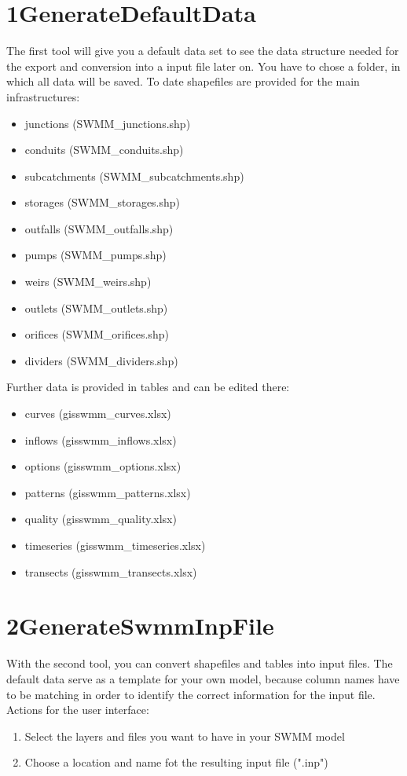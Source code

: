 \documentclass[10pt,a4paper,oneside]{scrbook}
\begin{document}
\section{1\textunderscore GenerateDefaultData} \label{tool1}
The first tool will give you a default data set to see the data structure needed for the export and conversion into a input file later on. You have to chose a folder, in which all data will be saved.  To date shapefiles are provided for the main infrastructures:
\begin{itemize}
	\setlength\itemsep{0pt}
    \item junctions (SWMM\_junctions.shp)
    \item conduits (SWMM\_conduits.shp)
    \item subcatchments (SWMM\_subcatchments.shp)
    \item storages (SWMM\_storages.shp)
    \item outfalls (SWMM\_outfalls.shp)
    \item pumps (SWMM\_pumps.shp)
    \item weirs (SWMM\_weirs.shp)
    \item outlets (SWMM\_outlets.shp)
    \item orifices (SWMM\_orifices.shp)
    \item dividers (SWMM\_dividers.shp)
\end{itemize}
Further data is provided in tables and can be edited there:
\begin{itemize}
	\setlength\itemsep{0pt}
    \item curves (gisswmm\_curves.xlsx)
    \item inflows (gisswmm\_inflows.xlsx)
    \item options (gisswmm\_options.xlsx)
    \item patterns (gisswmm\_patterns.xlsx)
    \item quality (gisswmm\_quality.xlsx)
    \item timeseries (gisswmm\_timeseries.xlsx)
    \item transects (gisswmm\_transects.xlsx)
\end{itemize}

\section{2\textunderscore GenerateSwmmInpFile} \label{tool2}
With the second tool, you can convert shapefiles and tables into input files. The default data serve as a template for your own model, because column names have to be matching in order to identify the correct information for the input file. Actions for the user interface:
\begin{enumerate}
	\setlength\itemsep{0pt}
	\item Select the layers and files you want to have in your SWMM model
	\item Choose a location and name fot the resulting input file (".inp")
\end{enumerate}
\end{document}
